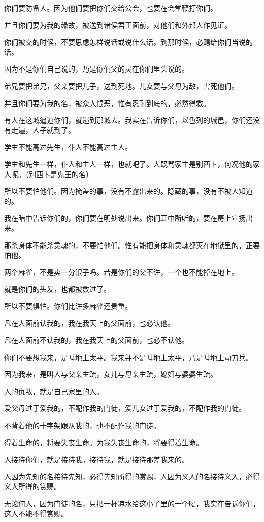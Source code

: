 \documentclass[12pt,oneside]{book}
\begin{document}
你们要防备人。因为他们要把你们交给公会，也要在会堂鞭打你们。

并且你们要为我的缘故，被送到诸侯君王面前，对他们和外邦人作见证。

你们被交的时候，不要思虑怎样说话或说什么话。到那时候，必赐给你们当说的话。

因为不是你们自己说的，乃是你们父的灵在你们里头说的。

弟兄要把弟兄，父亲要把儿子，送到死地。儿女要与父母为敌，害死他们。

并且你们要为我的名，被众人恨恶，惟有忍耐到底的，必然得救。

有人在这城逼迫你们，就逃到那城去。我实在告诉你们，以色列的城邑，你们还没有走遍，人子就到了。

学生不能高过先生，仆人不能高过主人。

学生和先生一样，仆人和主人一样，也就吧了。人既骂家主是别西卜，何况他的家人呢。（别西卜是鬼王的名）

所以不要怕他们。因为掩盖的事，没有不露出来的。隐藏的事，没有不被人知道的。

我在暗中告诉你们的，你们要在明处说出来。你们耳中所听的，要在房上宣扬出来。

那杀身体不能杀灵魂的，不要怕他们。惟有能把身体和灵魂都灭在地狱里的，正要怕他。

两个麻雀，不是卖一分银子吗。若是你们的父不许，一个也不能掉在地上。

就是你们的头发，也都被数过了。

所以不要惧怕。你们比许多麻雀还贵重。

凡在人面前认我的，我在我天上的父面前，也必认他。

凡在人面前不认我的，我在我天上的父面前，也必不认他。

你们不要想我来，是叫地上太平。我来并不是叫地上太平，乃是叫地上动刀兵。

因为我来，是叫人与父亲生疏，女儿与母亲生疏，媳妇与婆婆生疏。

人的仇敌，就是自己家里的人。

爱父母过于爱我的，不配作我的门徒，爱儿女过于爱我的，不配作我的门徒。

不背着他的十字架跟从我的，也不配作我的门徒。

得着生命的，将要失丧生命。为我失丧生命的，将要得着生命。

人接待你们，就是接待我。接待我，就是接待那差我来的。

人因为先知的名接待先知，必得先知所得的赏赐，人因为义人的名接待义人，必得义人所得的赏赐。

无论何人，因为门徒的名，只把一杯凉水给这小子里的一个喝，我实在告诉你们，这人不能不得赏赐。
\end{document}

